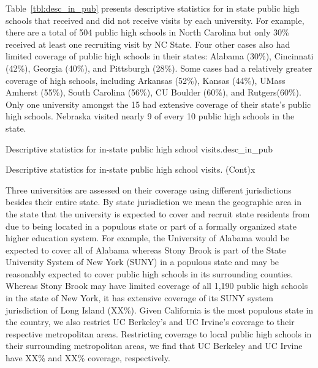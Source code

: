 \documentclass[twoside]{article}
\begin{document}
Table~\ref{tbl:desc_in_pub} presents descriptive statistics for in state public high schools that received and did not receive visits by each university. For example, there are a total of 504 public high schools in North Carolina but only 30\% received at least one recruiting visit by NC State.  Four other cases also had limited coverage of public high schools in their states: Alabama (30\%), Cincinnati (42\%), Georgia (40\%), and Pittsburgh (28\%). Some cases had a relatively greater coverage of high schools, including Arkansas (52\%), Kansas (44\%), UMass Amherst (55\%), South Carolina (56\%), CU Boulder (60\%), and Rutgers(60\%). Only one university amongst the 15 had extensive coverage of their state’s public high schools. Nebraska visited nearly 9 of every 10 public high schools in the state. 

\begin{lscape-env}{Descriptive statistics for in-state public high school visits.}{desc_in_pub}
  
\end{lscape-env}

 \begin{lscape-env}{Descriptive statistics for in-state public high school visits. (Cont)}{x}
  
\end{lscape-env}

Three universities are assessed on their coverage using different jurisdictions besides their entire state. By state jurisdiction we mean the geographic area in the state that the university is expected to cover and recruit state residents from due to being located in a populous state or part of a formally organized state higher education system. For example, the University of Alabama would be expected to cover all of Alabama whereas Stony Brook is part of the State University System of New York (SUNY) in a populous state and may be reasonably expected to cover public high schools in its surrounding counties. Whereas Stony Brook may have limited coverage of all 1,190 public high schools in the state of New York, it has extensive coverage of its SUNY system jurisdiction of Long Island (XX\%). Given California is the most populous state in the country, we also restrict UC Berkeley's and UC Irvine's coverage to their respective metropolitan areas. Restricting coverage to local public high schools in their surrounding metropolitan areas, we find that UC Berkeley and UC Irvine have XX\% and XX\% coverage, respectively. 
\end{document}
